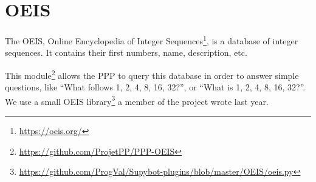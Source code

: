 \section{OEIS}

The OEIS, Online Encyclopedia of Integer Sequences\footnote{\url{https://oeis.org/}}, is a database of integer
sequences. It contains their first numbers, name, description, etc.

This module\footnote{\url{https://github.com/ProjetPP/PPP-OEIS}} allows the
PPP to query this database in order to answer simple questions, like
“What follows 1, 2, 4, 8, 16, 32?”, or “What is 1, 2, 4, 8, 16, 32?”. We use a small OEIS library\footnote{\url{https://github.com/ProgVal/Supybot-plugins/blob/master/OEIS/oeis.py}}
a member of the project wrote last year.
